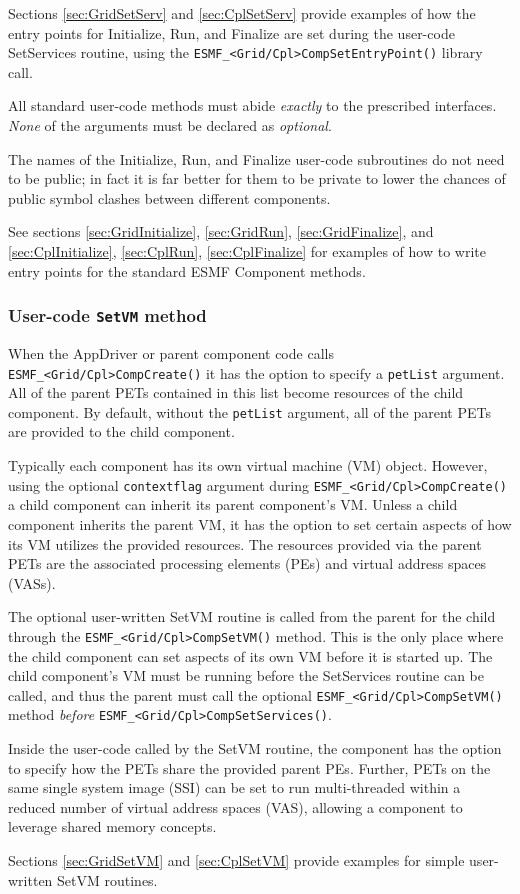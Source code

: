 Sections \ref{sec:GridSetServ} and \ref{sec:CplSetServ} provide examples
of how the entry points for Initialize, Run, and Finalize are set during
the user-code SetServices routine, using the 
{\tt ESMF\_<Grid/Cpl>CompSetEntryPoint()} library call.

All standard user-code methods must abide {\em exactly} to the prescribed
interfaces. {\em None} of the arguments must be declared as {\em optional}.

The names of the Initialize, Run, and Finalize user-code subroutines do
not need to be public; in fact it is far better for them to be private to
lower the chances of public symbol clashes between different components.

See sections \ref{sec:GridInitialize}, \ref{sec:GridRun},
\ref{sec:GridFinalize}, and \ref{sec:CplInitialize}, \ref{sec:CplRun},
\ref{sec:CplFinalize} for examples of how to write entry points for the 
standard ESMF Component methods.


\subsubsection{User-code {\tt SetVM} method}
\label{sec:AppDriverSetVM}

When the AppDriver or parent component code calls
{\tt ESMF\_<Grid/Cpl>CompCreate()} it has the option to specify a 
{\tt petList} argument. All of the parent PETs contained in this list become
resources of the child component. By default, without the {\tt petList} argument, all of the parent PETs are provided to the child component.

Typically each component has its own virtual machine (VM) object. However, using the optional {\tt contextflag} argument during {\tt ESMF\_<Grid/Cpl>CompCreate()} a child component can inherit its parent component's VM. Unless a child component inherits the parent VM, it has the option to set certain aspects of how its VM utilizes the provided resources. The resources provided via the parent PETs are the associated processing elements (PEs) and virtual address spaces (VASs).

The optional user-written SetVM routine is called from the parent for the child through the {\tt ESMF\_<Grid/Cpl>CompSetVM()} method. This is the only place where the child component can set aspects of its own VM before it is started up. The child component's VM must be running before the SetServices routine can be called, and thus the parent must call the optional {\tt ESMF\_<Grid/Cpl>CompSetVM()} method {\em before} {\tt ESMF\_<Grid/Cpl>CompSetServices()}.

Inside the user-code called by the SetVM routine, the component has the option to specify how the PETs share the provided parent PEs. Further, PETs on the same single system image (SSI) can be set to run multi-threaded within a reduced number of virtual address spaces (VAS), allowing a component to leverage shared memory concepts.

Sections \ref{sec:GridSetVM} and \ref{sec:CplSetVM} provide examples for
simple user-written SetVM routines.
